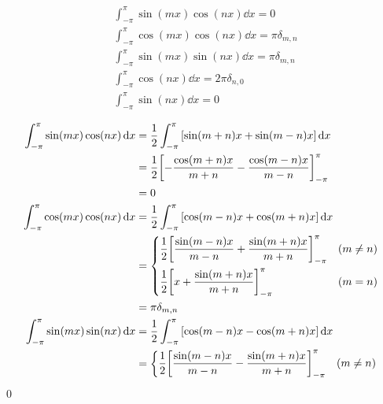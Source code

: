 \documentclass[uplatex,dvipdfmx,a4paper,11pt]{jlreq}
\makeatletter
\theoremstyle{definition}
\renewenvironment{proof}[1][\proofname]{\par
  \normalfont
  \topsep6\p@\@plus6\p@ \trivlist
  \item[\hskip\labelsep{\bfseries #1}\@addpunct{\bfseries}]\ignorespaces\quad\par
}{%
  \qed\endtrivlist\@endpefalse
}
\renewcommand\proofname{証明}
\makeatother
\begin{document}
\begin{proposition}
  \begin{align}
     & \int_{-\pi}^\pi \sin(mx)\cos(nx)\dd{x} = 0               \\
     & \int_{-\pi}^\pi \cos(mx)\cos(nx)\dd{x} = \pi\delta_{m,n} \\
     & \int_{-\pi}^\pi \sin(mx)\sin(nx)\dd{x} = \pi\delta_{m,n} \\
     & \int_{-\pi}^\pi \cos(nx)\dd{x} = 2\pi\delta_{n,0}        \\
     & \int_{-\pi}^\pi \sin(nx)\dd{x} = 0
  \end{align}
\end{proposition}
\begin{proof}
  \begin{align}
    \int_{-\pi}^\pi \sin(mx)\cos(nx)\dd{x} & = \frac{1}{2}\int_{-\pi}^\pi \qty[\sin(m + n)x + \sin(m - n)x]\dd{x}                           \\
                                           & = \frac{1}{2}\qty[- \frac{\cos(m + n)x}{m + n} - \frac{\cos(m - n)x}{m - n}]_{-\pi}^\pi        \\
                                           & = 0                                                                                            \\
    \int_{-\pi}^\pi \cos(mx)\cos(nx)\dd{x} & = \frac{1}{2}\int_{-\pi}^\pi \qty[\cos(m - n)x + \cos(m + n)x]\dd{x}                           \\
                                           & = \begin{dcases}
                                                 \frac{1}{2}\qty[\frac{\sin(m - n)x}{m - n} + \frac{\sin(m + n)x}{m + n}]_{-\pi}^\pi & (m \neq n) \\
                                                 \frac{1}{2}\qty[x + \frac{\sin(m + n)x}{m + n}]_{-\pi}^\pi                          & (m = n)
                                               \end{dcases} \\
                                           & = \pi\delta_{m,n}                                                                              \\
    \int_{-\pi}^\pi \sin(mx)\sin(nx)\dd{x} & = \frac{1}{2}\int_{-\pi}^\pi \qty[\cos(m - n)x - \cos(m + n)x]\dd{x}                           \\
                                           & = \begin{dcases}
                                                 \frac{1}{2}\qty[\frac{\sin(m - n)x}{m - n} - \frac{\sin(m + n)x}{m + n}]_{-\pi}^\pi & (m \neq n) \\

\end{dcases}
\end{align}
\end{proof}
\end{document}
